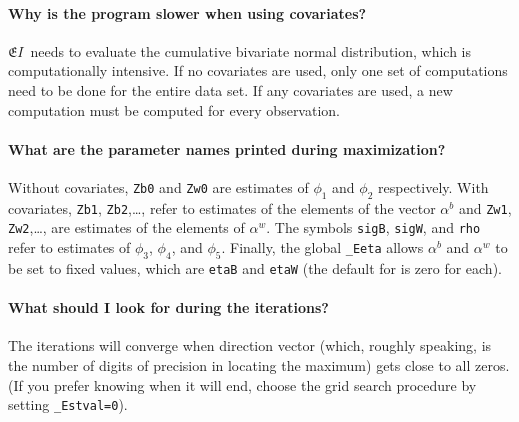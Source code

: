 \documentclass[11pt,titlepage]{article}
\newcommand{\EI}{\ensuremath{{\mathfrak EI}}}
\begin{document}
\paragraph{Why is the program slower when using covariates?}
\EI\ needs to evaluate the cumulative bivariate normal distribution,
which is computationally intensive.  If no covariates are used, only
one set of computations need to be done for the entire data set.  If
any covariates are used, a new computation must be computed for every
observation.

\paragraph{What are the parameter names printed during maximization?}
Without covariates, \texttt{Zb0} and \texttt{Zw0} are estimates of
$\phi_1$ and $\phi_2$ respectively.  With covariates, \texttt{Zb1},
\texttt{Zb2},\ldots, refer to estimates of the elements of the vector
$\alpha^b$ and \texttt{Zw1}, \texttt{Zw2},\ldots, are estimates of the
elements of $\alpha^w$.  The symbols \texttt{sigB}, \texttt{sigW}, and
\texttt{rho} refer to estimates of $\phi_3$, $\phi_4$, and $\phi_5$.
Finally, the global \texttt{\_Eeta} allows $\alpha^b$ and $\alpha^w$
to be set to fixed values, which are \texttt{etaB} and \texttt{etaW}
(the default for is zero for each).

\paragraph{What should I look for during the iterations?} The iterations
will converge when direction vector (which, roughly speaking, is the
number of digits of precision in locating the maximum) gets close to
all zeros.  (If you prefer knowing when it will end, choose the grid
search procedure by setting \texttt{\_Estval=0}).
\end{document}

